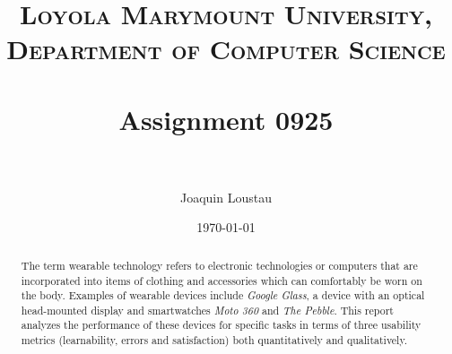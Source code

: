 \documentclass[11pt,a4paper]{scrartcl}
\title{	
\normalfont \normalsize 
\textsc{Loyola Marymount University, Department of Computer Science} \\ [25pt] 
\horrule{0.5pt} \\[0.4cm]
\huge Assignment 0925 \\ 
\horrule{2pt} \\[0.5cm]}
\author{Joaquin Loustau\\}
\date{\normalsize\today}
\begin{document}
\maketitle
\begin{abstract}
The term wearable technology refers to electronic technologies or computers that are incorporated into items of clothing and accessories which can comfortably be worn on the body. Examples of wearable devices include \textit{Google Glass}, a device with an optical head-mounted display and smartwatches \textit{Moto 360} and \textit{The Pebble}. This report analyzes the performance of these devices for specific tasks in terms of three usability metrics (learnability, errors and satisfaction) both quantitatively and qualitatively.
\end{abstract}

\end{document}
